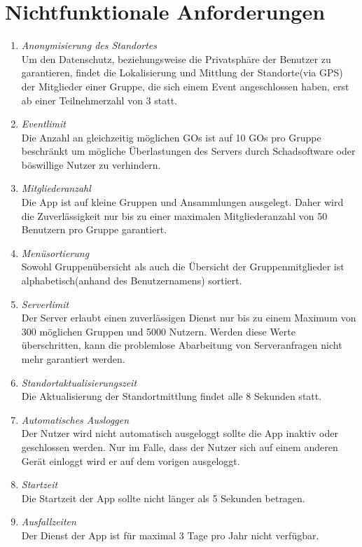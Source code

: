 \documentclass[parskip=full]{scrartcl}
\def\threedigits#1{%
  \ifnum#1<100 0\fi
  \ifnum#1<10 0\fi
  \number#1}
\begin{document}
\section{Nichtfunktionale Anforderungen}
\begin{enumerate}[label={\textbf{/NF\protect\threedigits{\theenumi}0/}}, leftmargin=*]
		\item \textit{Anonymisierung des Standortes} \\
		Um den Datenschutz, beziehungsweise die Privatsphäre der Benutzer zu garantieren, findet die Lokalisierung und Mittlung der Standorte(via GPS) der Mitglieder einer Gruppe, die sich einem Event angeschlossen haben, erst ab einer Teilnehmerzahl von 3 statt. 
		
		\item \textit{Eventlimit} \\
		Die Anzahl an gleichzeitig möglichen GOs ist auf 10 GOs pro Gruppe beschränkt um mögliche Überlastungen des Servers durch Schadsoftware oder böswillige Nutzer zu verhindern.
		
		\item \textit{Mitgliederanzahl} \\
		Die App ist auf kleine Gruppen und Ansammlungen ausgelegt. Daher wird die Zuverlässigkeit nur bis zu einer maximalen Mitgliederanzahl von 50 Benutzern pro Gruppe garantiert.
		
		\item \textit{Menüsortierung} \\
		Sowohl Gruppenübersicht als auch die Übersicht der Gruppenmitglieder ist alphabetisch(anhand des Benutzernamens) sortiert. 
		
		\item \textit{Serverlimit} \\
		Der Server erlaubt einen zuverlässigen Dienst nur bis zu einem Maximum von 300 möglichen Gruppen und 5000 Nutzern. Werden diese Werte überschritten, kann die problemlose Abarbeitung von Serveranfragen nicht mehr garantiert werden.
		
		\item \textit{Standortaktualisierungszeit} \\
		Die Aktualisierung der Standortmittlung findet alle 8 Sekunden statt.
		
		\item \textit{Automatisches Ausloggen} \\
		Der Nutzer wird nicht automatisch ausgeloggt sollte die App inaktiv oder geschlossen werden. Nur im Falle, dass der Nutzer sich auf einem anderen Gerät einloggt wird er auf dem vorigen ausgeloggt.
		
		\item \textit{Startzeit} \\
		Die Startzeit der App sollte nicht länger als 5 Sekunden betragen.
		
		\item \textit{Ausfallzeiten} \\
		Der Dienst der App ist für maximal 3 Tage pro Jahr nicht verfügbar.
		
\end{enumerate}
\end{document}
